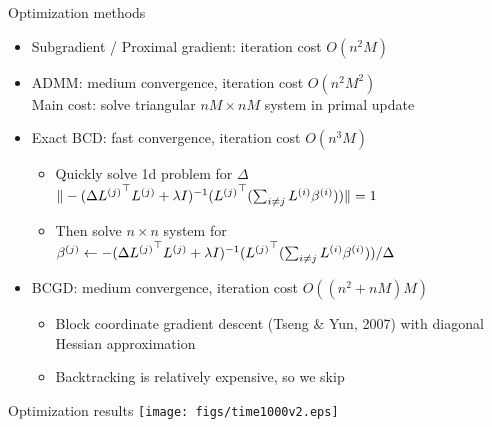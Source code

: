 \begin{frame}{Optimization methods}
\begin{itemize}
\item Subgradient / Proximal gradient: iteration cost $O(n^2M)$
\item ADMM: medium convergence, iteration cost $O(n^2M^2)$ \\
Main cost: solve triangular $nM \times nM$ system in primal update
\item Exact BCD: fast convergence, iteration cost $O(n^3 M)$ \\
\begin{itemize}
\item Quickly solve 1d problem for $\Delta$
$\|-(\Delta {L^{(j)}}^\top{L^{(j)}} + \lambda I)^{-1}({L^{(j)}}^\top (\sum_{i\neq j}{L^{(i)}} {\beta^{(i)}}))\|=1$
\item Then solve $n \times n$ system for 
${\beta^{(j)}} \leftarrow -(\Delta {L^{(j)}}^\top{L^{(j)}}+\lambda I)^{-1}({L^{(j)}}^\top(\sum_{i\neq j}{L^{(i)}} {\beta^{(i)}}))/\Delta$
\end{itemize}
\item BCGD: medium convergence, iteration cost $O((n^2+nM)M)$
\begin{itemize}
\item Block coordinate gradient descent (Tseng \& Yun, 2007) 
with diagonal Hessian approximation
\item Backtracking is relatively expensive, so we skip
\end{itemize}
\end{itemize}
\end{frame}

\begin{frame}{Optimization results}
\texttt{[image: figs/time1000v2.eps]}
\end{frame}
